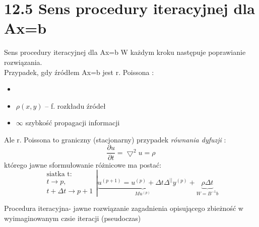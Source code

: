 \section{12.5 Sens procedury iteracyjnej dla Ax=b}

\begin{frame}{Sens procedury iteracyjnej dla Ax=b}
  W każdym kroku następuje poprawianie rozwiązania.\\
  Przypadek, gdy źródłem Ax=b jest r. Poissona :
  \begin{itemize}
    \item {}
    \item $\rho(x,y)$ -- f. rozkładu źródeł
    \item $\infty$ szybkość propagacji informacji
  \end{itemize}
\end{frame}

\begin{frame}{}
  Ale r. Poissona to graniczny (stacjonarny) przypadek \emph{równania dyfuzji} :
  $$\boxed{\frac{\partial u}{\partial t} = \bigtriangledown^2u=\rho}$$
  którego jawne sformułowanie różnicowe ma postać:
  $$
  \left.
  \begin{array}{lr}
    \text{siatka t}:\\
    t\rightarrow p,\\
    t+\Delta t\rightarrow p+1
  \end{array}\right|
  \underbrace{u^{(p+1)}=u^{(p)}+\Delta t\Delta^{||}y^{(p)}}_{Mu^{(p)}}+\underbrace{\rho\Delta t}_{W=B^{-1}b}
  $$
  

  Procedura iteracyjna- jawne rozwiązanie zagadnienia opisującego zbieżność w wyimaginowanym czsie iteracji (pseudoczas)
\end{frame}

